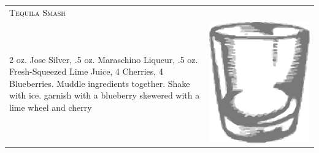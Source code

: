 \documentclass{article}
\begin{document}
\begin{multicols}{2}
\begin{tabular}{p{2in} p{0.5in}}
\multicolumn{2}{p{3in}}{\centering\Huge\textsc{Tequila Smash}} \\ 
  \vspace{-0.1in}2 oz. Jose Silver, .5 oz. Maraschino Liqueur, .5 oz. Fresh-Squeezed Lime Juice, 4 Cherries, 4 Blueberries. Muddle ingredients together. Shake with ice.  garnish with a blueberry skewered with a lime wheel and cherry &
  \vspace{-0.1in} \includegraphics{rocks_glass.png}
\end{tabular}


\end{multicols}
\end{document}
